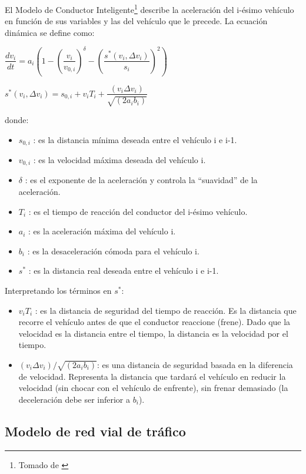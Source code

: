 \documentclass[colorinlistoftodos,twoside,twocolumn]{article} %
\begin{document}
	El Modelo de Conductor Inteligente\footnote{Tomado de \cite{A1}} describe la aceleración del i-ésimo vehículo en función de sus variables y las del vehículo que le precede. La ecuación dinámica se define como:
	
	\begin{center}
		$  \dfrac{dv_{i}}{dt} = a_{i} \left(1 - \left(\dfrac{v_{i}}{v_{0,i}}\right)^{\delta} - \left(\dfrac{s^{*}(v_{i}, \Delta v_{i})}{s_{i}}\right)^{2}\right)$
		
		\vspace{0.5em}
		$ s^{*}(v_{i}, \Delta v_{i}) =  s_{0,i} + v_{i}T_{i} + \dfrac{(v_{i} \Delta v_{i})}{\sqrt{(2a_{i} b_{i})}}$
	\end{center}
	donde:
	\begin{itemize}
		\item $ s_{0,i} $ : es la distancia mínima deseada entre el vehículo i e i-1.
		\item $ v_{0,i} $ : es la velocidad máxima deseada del vehículo i.
		\item $\delta$ : es el exponente de la aceleración y controla la “suavidad” de la aceleración.
		\item $ T_{i} $  : es el tiempo de reacción del conductor del i-ésimo vehículo.
		\item $ a_{i} $ : es la aceleración máxima del vehículo i.
		\item $ b_{i} $ : es la desaceleración cómoda para el vehículo i.
		\item $ s^{*} $ : es la distancia real deseada entre el vehículo i e i-1.
	\end{itemize}
	
	Interpretando los t\'erminos en $ s^{*} $:
	\begin{itemize}
		\item $ v_{i}T_{i}  $ : es la distancia de seguridad del tiempo de reacción. Es la distancia que recorre el vehículo antes de que el conductor reaccione (frene).
		Dado que la velocidad es la distancia entre el tiempo, la distancia es la velocidad por el tiempo.
		\item $ (v_{i} \Delta v_{i})/\sqrt{(2a_{i} b_{i})} $: es una distancia de seguridad basada en la diferencia de velocidad. Representa la distancia que tardará el vehículo en reducir la velocidad (sin chocar con el vehículo de enfrente), sin frenar demasiado (la deceleración debe ser inferior a $ b_{i} $).
	\end{itemize}
	
	\subsection{Modelo de red vial de tráfico}
	
\end{document}
